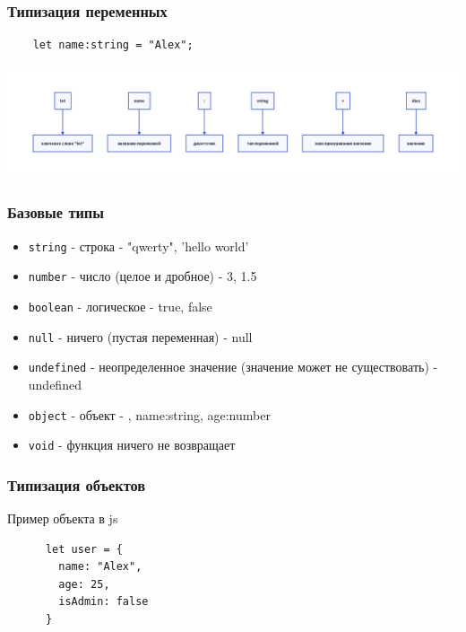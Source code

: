 \documentclass[aspectratio=169]{beamer}
\begin{document}

\begin{frame}[fragile]

  \frametitle{Типизация переменных}

  \begin{verbatim}
    let name:string = "Alex"; 
  \end{verbatim}

  \includegraphics[width=\textwidth]{assets/description.png}
  
\end{frame}


\begin{frame}

  \frametitle{Базовые типы}
  \begin{itemize}
  \item \texttt{string} - строка - "qwerty", 'hello world' \\
  \item \texttt{number} - число (целое и дробное) - 3, 1.5 \\
  \item \texttt{boolean} - логическое - true, false \\
  \item \texttt{null} - ничего (пустая переменная) - null \\
  \item \texttt{undefined} - неопределенное значение (значение может не существовать) - undefined \\
  \item \texttt{object} - объект - {}, {name:string, age:number} \\
  \item \texttt{void} - функция ничего не возвращает \\
  \end{itemize}
  
\end{frame}


\begin{frame}[fragile]

  \frametitle{Типизация объектов}

  \begin{alertblock}{Пример объекта в js}
    \begin{verbatim}
      let user = {
        name: "Alex",
        age: 25,
        isAdmin: false
      }
    \end{verbatim}
  \end{alertblock}

\end{frame}
\end{document}

